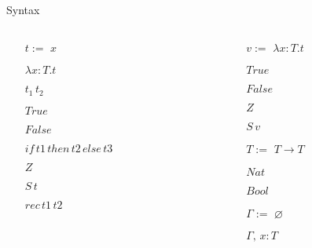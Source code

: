 \documentclass[presentation]{beamer}
\begin{document}
\begin{frame}[label={sec:org7777010}]{Syntax}
\begin{columns}
\begin{column}[t]{0.5\columnwidth}
\begin{itemize}
\item[$t :=$] $x$
\item[] $\lambda x:T.t$
\item[] $t_1\,t_2$
\item[] $True$
\item[] $False$
\item[] $if \, t1 \, then \, t2 \, else \, t3$
\item[] $Z$
\item[] $S\,t$
\item[] $rec \, t1 \, t2$
\end{itemize}
\end{column}

\begin{column}[t]{0.5\columnwidth}
\begin{itemize}
\item[$v :=$] $\lambda x:T.t$
\item[] $True$
\item[] $False$
\item[] $Z$
\item[] $S\,v$
\end{itemize}

\begin{itemize}
\item[$T :=$] $T \to T$
\item[] $Nat$
\item[] $Bool$
\end{itemize}

\begin{itemize}
\item[$\Gamma :=$] $\varnothing$
\item[] $\Gamma,\,x:T$
\end{itemize}
\end{column}
\end{columns}
\end{frame}
\end{document}
